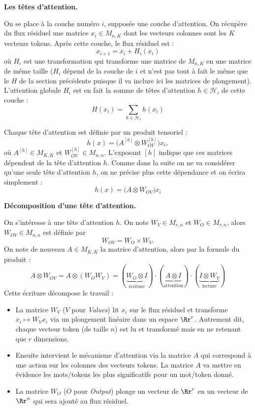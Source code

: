 \documentclass[11pt,class=report,crop=false]{standalone}
\begin{document}
\textbf{Les têtes d'attention.}

On se place à la couche numéro $i$, supposée une couche d'attention.
On récupère du flux résiduel une matrice $x_i \in M_{n,K}$ 
dont les vecteurs colonnes sont les $K$ vecteurs tokens.
Après cette couche, le flux résiduel est :
$$x_{i+1} = x_i + H_i ( x_i )$$
où $H_i$ est une transformation qui transforme une matrice de $M_{n,K}$ en une matrice de même taille ($H_i$ dépend de la couche de $i$ et n'est pas tout à fait le même que le $H$ de la section précédente puisque il va inclure ici les matrices de plongement).
L'attention globale $H_i$ est en fait la somme de têtes d'attention $h \in \mathcal{H}_i$ de cette couche :
$$H (x_i)  = \sum_{h \in \mathcal{H}_i} h (x_i) $$

Chaque tête d'attention est définie par un produit tensoriel :
$$h(x) = \big(A^{[h]} \otimes W^{[h]}_{OV} \big) x_i,$$
où $A^{[h]} \in M_{K,K}$ et $W^{[h]}_{OV} \in M_{n,n}$.
L'exposant $[h]$ indique que ces matrices dépendent de la tête d'attention $h$. Comme dans la suite on ne va considérer qu'une seule tête d'attention $h$, on ne précise plus cette dépendance et on écrira simplement :
$$h(x) = \big(A \otimes W_{OV} \big) x_i$$

\bigskip

\textbf{Décomposition d'une tête d'attention.}

On s'intéresse à une tête d'attention $h$.
On note $W_V \in M_{r,n}$ et $W_O \in M_{r,n}$, alors $W_{OV} \in M_{n,n}$ est définie par 
$$W_{OV} = W_O \times W_V.$$
On note de nouveau $A \in M_{K,K}$ la matrice d'attention, alors par la formule du produit :
\[
A \otimes W_{OV} = A \otimes (W_O W_V) = 
(\underbrace{W_O \otimes I}_{\text{écriture}}) \cdot 
(\underbrace{A \otimes I}_{\text{attention}}) \cdot (\underbrace{I \otimes W_V}_{\text{lecture}})
\]
Cette écriture décompose le travail :
\begin{itemize}
	\item La matrice $W_V$ ($V$ pour \emph{Values}) lit $x_i$ sur le flux résiduel et transforme $x_i \mapsto W_V x_i$  via un plongement linéaire dans un espace $\Rr^r$. Autrement dit, chaque vecteur token (de taille $n$) est lu et transformé mais en ne retenant que $r$ dimensions.
	
	\item Ensuite intervient le mécanisme d'attention via la matrice $A$ qui correspond à une action sur les colonnes des vecteurs tokens. La matrice $A$ va mettre en évidence les mots/tokens les plus significatifs pour un mot/token donné.
	
	\item La matrice $W_O$ ($O$ pour \emph{Output}) plonge un vecteur de $\Rr^r$ en un vecteur de $\Rr^n$ qui sera ajouté au flux résiduel.
\end{itemize}
\end{document}
